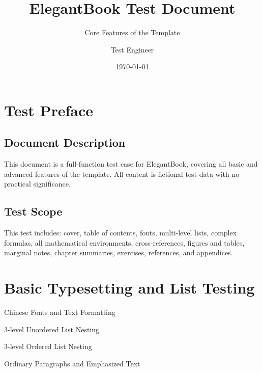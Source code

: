 \title{ElegantBook Test Document}
\subtitle{Core Features of the Template}
\author{Test Engineer}
\date{\today}

\setcounter{tocdepth}{3} %





\maketitle
\frontmatter
\tableofcontents

\setcounter{page}{0}
\chapter*{Test Preface}
\section*{Document Description}
This document is a full-function test case for ElegantBook, covering all basic and advanced features of the template. All content is fictional test data with no practical significance.
\newpage
\section*{Test Scope}
This test includes: cover, table of contents, fonts, multi-level lists, complex formulas, all mathematical environments, cross-references, figures and tables, marginal notes, chapter summaries, exercises, references, and appendices.

\mainmatter

\chapter{Basic Typesetting and List Testing}
\begin{introduction}
\item Chinese Fonts and Text Formatting
\item 3-level Unordered List Nesting
\item 3-level Ordered List Nesting
\item Ordinary Paragraphs and Emphasized Text
\end{introduction}

